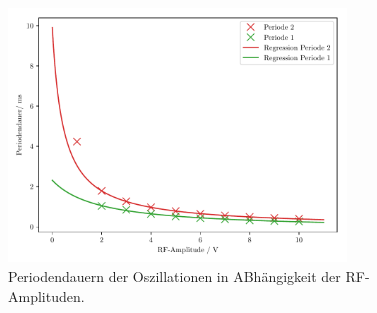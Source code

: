 \begin{figure}[H]
  \centering
  \includegraphics[width=0.8\textwidth]{Berechnung/perioden.pdf}
  \caption{Periodendauern der Oszillationen in ABhängigkeit der RF-Amplituden.}
  \label{fig:resonanz}
\end{figure}
